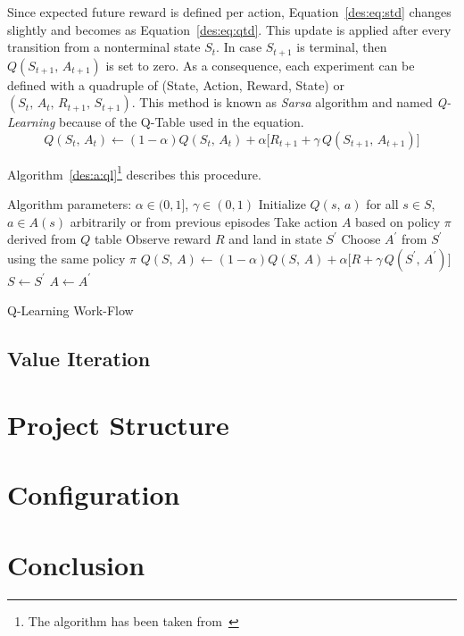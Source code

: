 Since expected future reward is defined per action, Equation~\ref{des:eq:std} changes slightly and becomes as Equation~\ref{des:eq:qtd}. This update is applied after every transition from a nonterminal state $S_t$. In case $S_{t+1}$ is terminal, then $Q(S_{t+1},\,A_{t+1})$ is set to zero. As a consequence, each experiment can be defined with a quadruple of (State, Action, Reward, State) or $(S_{t},\,A_{t},\,R_{t+1},\,S_{t+1})$. This method is known as \emph{Sarsa} algorithm and named \emph{Q-Learning} because of the Q-Table used in the equation.
\begin{equation}
Q(S_t,\,A_t) \longleftarrow (1-\alpha)Q(S_t,\,A_t) + \alpha\big[R_{t+1} + \gamma\,Q(S_{t+1},\,A_{t+1})\big]
\label{des:eq:qtd}
\end{equation}



Algorithm~\ref{des:a:ql}\footnote{The algorithm has been taken from~\textcite{rlIntro}} describes this procedure.
\begin{algorithm}[h]
	\DontPrintSemicolon
	
	\textup{Algorithm parameters: $\alpha \in (0,1]$, $\gamma \in (0,1)$}\;
	\textup{Initialize $Q(s,\,a)$ for all $s \in S$, $a \in A(s)$} arbitrarily or from previous episodes\;
	\BlankLine
	 {
		\textup{Take action $A$ based on policy $\pi$ derived from $Q$ table}\;
		\textup{Observe reward $R$ and land in state $S^\prime$}\;
		\textup{Choose $A^\prime$ from $S^\prime$ using the same policy $\pi$}\;
		\BlankLine
		$Q(S,\,A) \gets (1-\alpha)Q(S,\,A) + \alpha\big[R + \gamma\,Q(S^\prime,\,A^\prime)\big]$\;
		\BlankLine
		$S \gets S^\prime$\;
		$A \gets A^\prime$
	}
	\caption{Q-Learning Work-Flow}
	\label{des:a:ql}
\end{algorithm}

\subsection{Value Iteration}
\label{des:val}

\section{Project Structure}
\label{des:proj}

\section{Configuration}
\label{des:conf}

\section{Conclusion}
\label{des:conc}